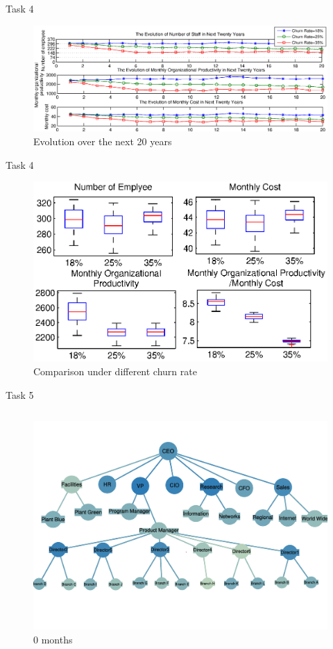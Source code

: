 \documentclass{beamer}
\begin{document}
\begin{CJK*}{UTF8}{gbsn}
\begin{frame}{Task 4}
\begin{figure}
\centering
\includegraphics[width=\textwidth]{fig/task-4-1.eps}
\caption{Evolution over the next 20 years}
\end{figure}
\end{frame}

\begin{frame}{Task 4}
\begin{figure}
\centering
\includegraphics[width=\textwidth]{fig/task-4-2.eps}
\caption{Comparison under different churn rate}
\end{figure}
\end{frame}


\begin{frame}{Task 5}

\begin{columns}
\begin{figure}
\centering
\includegraphics[width=\textwidth]{fig/task-5-1.pdf}
\caption{0 months}
\end{figure}




\end{columns}
\end{frame}
\end{CJK*}
\end{document}
